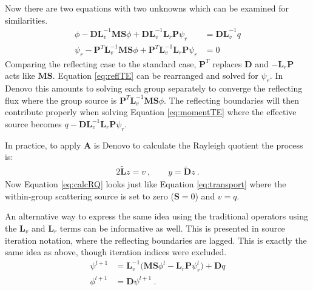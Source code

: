 \documentclass[12pt, letterpaper]{article}
\newcommand{\ve}[1]{\ensuremath{\mathbf{#1}}}
\begin{document}
Now there are two equations with two unknowns which can be examined for similarities.
\begin{align}
  \phi - \ve{DL}_{v}^{-1}\ve{MS}\phi + \ve{DL}_{v}^{-1}\ve{L}_{r}\ve{P} \psi_{r} &= \ve{DL}_{v}^{-1} q 
\label{eq:momentTE} \\
  \psi_{r} - \ve{P}^{T}\ve{L}_{v}^{-1}\ve{MS} \phi + \ve{P}^{T}\ve{L}_{v}^{-1} \ve{L}_{r} \ve{P} \psi_{r} &= 0 
\label{eq:reflTE}
\end{align}
Comparing the reflecting case to the standard case, $\ve{P}^{T}$ replaces $\ve{D}$ and $-\ve{L}_{r}\ve{P}$ acts like $\ve{MS}$. Equation \eqref{eq:reflTE} can be rearranged and solved for $\psi_{r}$. In Denovo this amounts to solving each group separately to converge the reflecting flux where the group source is $\ve{P}^{T}\ve{L}_{v}^{-1}\ve{MS} \phi$. The reflecting boundaries will then contribute properly when solving Equation \eqref{eq:momentTE} where the effective source becomes $q - \ve{DL}_{v}^{-1}\ve{L}_{r}\ve{P} \psi_{r}$.  

In practice, to apply $\ve{A}$ is Denovo to calculate the Rayleigh quotient the process is:
%
\begin{alignat}{2}
  \ve{\tilde{L}} z = v \:, \qquad y = \ve{\tilde{D}}z \:.
\label{eq:calcRQ}
\end{alignat}
%
Now Equation \eqref{eq:calcRQ} looks just like Equation \eqref{eq:transport} where the within-group scattering source is set to zero ($\ve{S} = 0$) and $v = q$. 

An alternative way to express the same idea using the traditional operators using the $\ve{L}_{v}$ and $\ve{L}_{r}$ terms can be informative as well. This is presented in source iteration notation, where the reflecting boundaries are lagged. This is exactly the same idea as above, though iteration indices were excluded.
\begin{align}
  \psi^{l+1} &= \ve{L}_{v}^{-1} \bigl( \ve{MS} \phi^{l} - \ve{L}_{r} \ve{P} \psi_{r}^{l} \bigr) + \ve{D}q 
\label{eq:laggedSI} \\
  \phi^{l+1} &= \ve{D}\psi^{l+1} \:.
\end{align}

\end{document}
